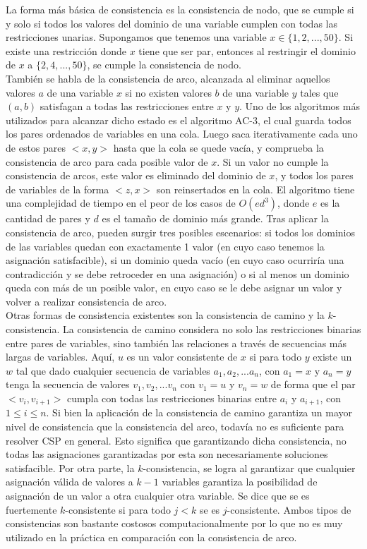 \documentclass[runningheads]{llncs}
\begin{document}
La forma más básica de consistencia es la consistencia de nodo, que se cumple si y solo si todos los valores del dominio de una variable cumplen con todas las restricciones unarias. Supongamos que tenemos una variable $x \in \{1,2,...,50\}$. Si existe una restricción donde $x$ tiene que ser par, entonces al restringir el dominio de $x$ a $\{2,4,...,50\}$, se cumple la consistencia de nodo.\\

También se habla de la consistencia de arco, alcanzada al eliminar aquellos valores $a$ de una variable $x$ si no existen valores $b$ de una variable $y$ tales que $(a,b)$ satisfagan a todas las restricciones entre $x$ y $y$. Uno de los algoritmos más utilizados para alcanzar dicho estado es el algoritmo AC-3, el cual guarda todos los pares ordenados de variables en una cola. Luego saca iterativamente cada uno de estos pares $<x,y>$ hasta que la cola se quede vacía, y comprueba la consistencia de arco para cada posible valor de $x$. Si un valor no cumple la consistencia de arcos, este valor es eliminado del dominio de $x$, y todos los pares de variables de la forma $<z,x>$ son reinsertados en la cola. El algoritmo tiene una complejidad de tiempo en el peor de los casos de $O(ed^3 )$, donde $e$ es la cantidad de pares y $d$ es el tamaño de dominio más grande. Tras aplicar la consistencia de arco, pueden surgir tres posibles escenarios: si todos los dominios de las variables quedan con exactamente 1 valor (en cuyo caso tenemos la asignación satisfacible), si un dominio queda vacío (en cuyo caso ocurriría una contradicción y se debe retroceder en una asignación) o si al menos un dominio queda con más de un posible valor, en cuyo caso se le debe asignar un valor y volver a realizar consistencia de arco.\\

Otras formas de consistencia existentes son la consistencia de camino y la $k$-consistencia. La consistencia de camino considera no solo las restricciones binarias entre pares de variables, sino también las relaciones a través de secuencias más largas de variables. Aquí, $u$ es un valor consistente de $x$ si para todo $y$ existe un $w$ tal que dado cualquier secuencia de variables $a_1, a_2, ... a_n$, con $a_1=x$ y $a_n=y$ tenga la secuencia de valores $v_1, v_2, ... v_n$ con $v_1=u$ y $v_n=w$ de forma que el par $<v_i,v_{i+1}>$ cumpla con todas las restricciones binarias entre $a_i$ y $a_{i+1}$, con $1\leq  i \leq  n$. Si bien la aplicación de la consistencia de camino garantiza un mayor nivel de consistencia que la consistencia del arco, todavía no es suficiente para resolver CSP en general. Esto significa que garantizando dicha consistencia, no todas las asignaciones garantizadas por esta son necesariamente soluciones satisfacible. Por otra parte, la $k$-consistencia, se logra al garantizar que cualquier asignación válida de valores a $k-1$ variables garantiza la posibilidad de asignación de un valor a otra cualquier otra variable. Se dice que se es fuertemente $k$-consistente si para todo $j<k$ se es $j$-consistente. Ambos tipos de consistencias son bastante costosos computacionalmente por lo que no es muy utilizado en la práctica en comparación con la consistencia de arco.\\
\end{document}
